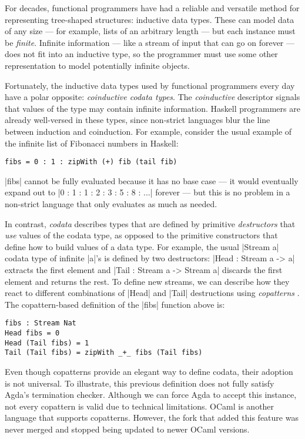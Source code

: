 For decades, functional programmers have had a reliable and versatile method for representing tree-shaped structures: inductive data types.
These can model data of any size --- for example, lists of an arbitrary length --- but each instance must be \emph{finite}.
Infinite information --- like a stream of input that can go on forever --- does not fit into an inductive type, so the programmer must use some other representation to model potentially infinite objects.

Fortunately, the inductive data types used by functional programmers every day have a polar opposite: \emph{coinductive codata types}.
The \emph{coinductive} descriptor signals that values of the type may contain infinite information.
Haskell programmers are already well-versed in these types, since non-strict languages blur the line between induction and coinduction.
For example, consider the usual example of the infinite list of Fibonacci numbers in Haskell:
\begin{verbatim}
fibs = 0 : 1 : zipWith (+) fib (tail fib)
\end{verbatim}
\hs|fibs| cannot be fully evaluated because it has no base case --- it would eventually expand out to \hs|0 : 1 : 1 : 2 : 3 : 5 : 8 : ...| forever --- but this is no problem in a non-strict language that only evaluates as much as needed.

In contrast, \emph{codata} describes types that are defined by primitive \emph{destructors} that \emph{use} values of the codata type, as opposed to the primitive constructors that define how to build values of a data type.
For example, the usual \agda|Stream a| codata type of infinite \agda|a|'s is defined by two destructors: \agda|Head : Stream a -> a| extracts the first element and \agda|Tail : Stream a -> Stream a| discards the first element and returns the rest.
To define new streams, we can describe how they react to different combinations of \agda|Head| and \agda|Tail| destructions using \emph{copatterns} \cite{APTS2013C}.  The copattern-based definition of the \agda|fibs| function above is:
\begin{verbatim}
fibs : Stream Nat
Head fibs = 0
Head (Tail fibs) = 1
Tail (Tail fibs) = zipWith _+_ fibs (Tail fibs)
\end{verbatim}
Even though copatterns provide an elegant way to define codata, their adoption is not universal.
To illustrate, this previous definition does not fully satisfy Agda's termination checker.
Although we can force Agda to accept this instance, not every copattern is valid due to technical limitations.
OCaml is another language that supports copatterns.
However, the fork that added this feature was never merged and stopped being updated to newer OCaml versions.

